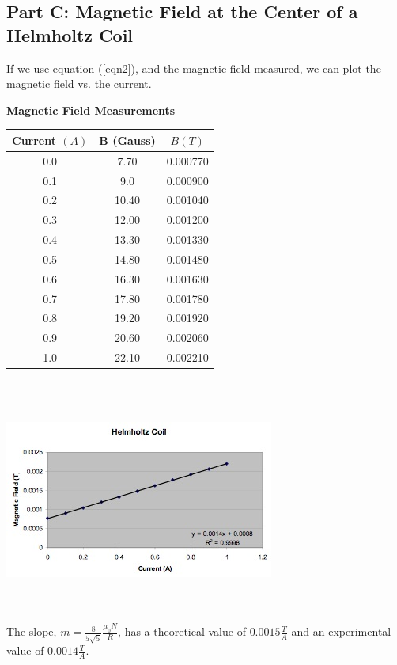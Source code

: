 \documentclass[titlepage]{article}
\begin{document}
\subsection{Part C: Magnetic Field at the Center of a Helmholtz Coil}\label{sub:part_c_magnetic_field_at_the_center_of_a_helmholtz_coil-anl}
If we use equation (\ref{eqn2}), and the magnetic field measured, we can plot the magnetic field vs. the current.

\begin{center}\label{tbl10}
	\textbf{Magnetic Field Measurements}\\
	\begin{tabular}{ccc}
	\hline
	Current $(A)$ & B (Gauss) & $B(T)$\\
	\hline
	0.0 & 7.70 & 0.000770\\
	\hline
	0.1 & 9.0 & 0.000900\\
	\hline
	0.2 & 10.40 & 0.001040\\
	\hline
	0.3 & 12.00 & 0.001200\\
	\hline
	0.4 & 13.30 & 0.001330\\
	\hline
	0.5 & 14.80 & 0.001480\\
	\hline
	0.6 & 16.30 & 0.001630\\
	\hline
	0.7 & 17.80 & 0.001780\\
	\hline
	0.8 & 19.20 & 0.001920\\
	\hline
	0.9 & 20.60 & 0.002060\\
	\hline
	1.0 & 22.10 & 0.002210\\
	\hline
	\end{tabular}
\end{center}\\
\\
\begin{center}\label{g2}
	\includegraphics{2.jpg}
\end{center}\\
\\The slope, $m = \frac{8}{5\sqrt{5}} \frac{\mu_0 N}{R}$, has a theoretical value of $0.0015 \frac{T}{A}$ and an experimental value of $0.0014 \frac{T}{A}$.
\end{document}
